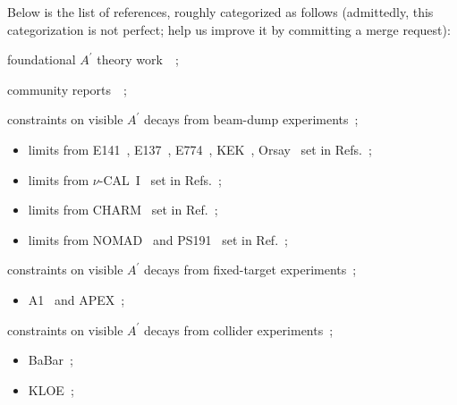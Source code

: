 \documentclass[a4paper,11pt]{article}
\def\aprime{\ensuremath{A^{\prime}}\xspace}
\begin{document}
\noindent Below is the list of references, roughly categorized as follows (admittedly, this categorization is not perfect; help us improve it by committing a merge request):
\begin{list}{--}{\leftmargin=1em}
  \item foundational \aprime theory work~~\cite{Okun:1982xi,Galison:1983pa,Holdom:1985ag,Pospelov:2007mp,ArkaniHamed:2008qn,Bjorken:2009mm};
  \item community reports~~\cite{Essig:2013lka,Alexander:2016aln,Battaglieri:2017aum};
  \item constraints on visible \aprime decays from beam-dump experiments~\cite{Bergsma:1985is,Konaka:1986cb,Riordan:1987aw,Bjorken:1988as,Bross:1989mp,Davier:1989wz,Athanassopoulos:1997er,Astier:2001ck,Bjorken:2009mm,Essig:2010gu,Williams:2011qb,Blumlein:2011mv,Gninenko:2012eq,Blumlein:2013cua,Andreas:2012mt,Blumlein:1990ay,Blumlein:1991xh,Bergsma:1985qz,Bernardi:1985ny,Gninenko:2011uv};
  \begin{itemize}
    \item limits from E141~\cite{Riordan:1987aw}, E137~\cite{Bjorken:1988as}, E774~\cite{Bross:1989mp}, KEK~\cite{Konaka:1986cb}, Orsay~\cite{Davier:1989wz} set in Refs.~\cite{Bjorken:2009mm,Andreas:2012mt};
    \item limits from $\nu$-CAL~I~\cite{Blumlein:1990ay,Blumlein:1991xh} set in Refs.~\cite{Blumlein:2011mv,Blumlein:2013cua};
    \item limits from CHARM~\cite{Bergsma:1985qz} set in Ref.~\cite{Gninenko:2012eq};
    \item limits from NOMAD~\cite{Astier:2001ck} and PS191~\cite{Bernardi:1985ny} set in Ref.~\cite{Gninenko:2011uv};
  \end{itemize}
  \item constraints on visible \aprime decays from fixed-target experiments~\cite{Abrahamyan:2011gv,Merkel:2014avp,Merkel:2011ze};
  \begin{itemize}
    \item A1~\cite{Merkel:2014avp} and APEX~\cite{Abrahamyan:2011gv};
  \end{itemize}
  \item constraints on visible \aprime decays from collider experiments~\cite{Aubert:2009cp,Curtin:2013fra,Lees:2014xha,Ablikim:2017aab,Aaij:2017rft,Archilli:2011zc,KLOE:2016lwm};
  \begin{itemize}
    \item BaBar~\cite{Lees:2014xha};
    \item KLOE~\cite{Archilli:2011zc,KLOE:2016lwm};

\end{itemize}
\end{list}
\end{document}

